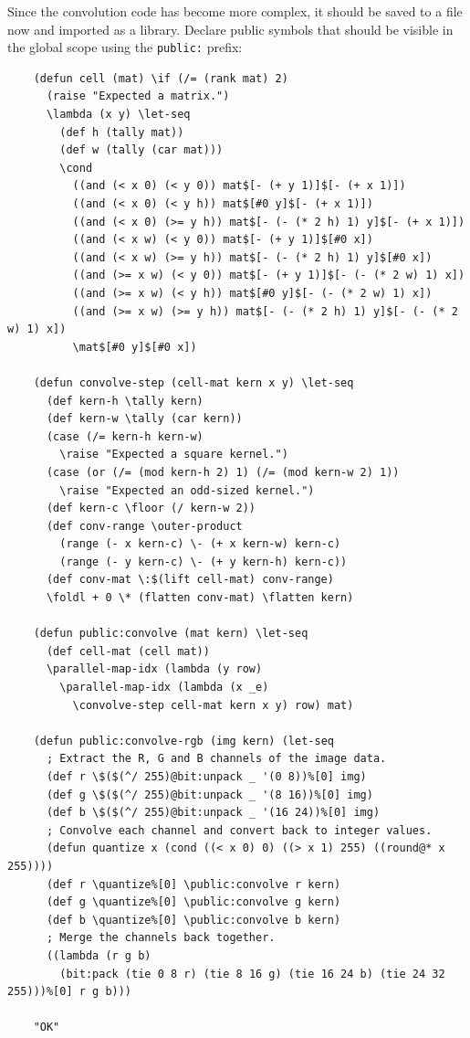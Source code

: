 Since the convolution code has become more complex, it should be saved to a file now and imported as a library. Declare public symbols that should be visible in the global scope using the \verb|public:| prefix:

\begin{Verbatim}
    (defun cell (mat) \if (/= (rank mat) 2)
      (raise "Expected a matrix.")
      \lambda (x y) \let-seq
        (def h (tally mat))
        (def w (tally (car mat)))
        \cond
          ((and (< x 0) (< y 0)) mat$[- (+ y 1)]$[- (+ x 1)])
          ((and (< x 0) (< y h)) mat$[#0 y]$[- (+ x 1)])
          ((and (< x 0) (>= y h)) mat$[- (- (* 2 h) 1) y]$[- (+ x 1)])
          ((and (< x w) (< y 0)) mat$[- (+ y 1)]$[#0 x])
          ((and (< x w) (>= y h)) mat$[- (- (* 2 h) 1) y]$[#0 x])
          ((and (>= x w) (< y 0)) mat$[- (+ y 1)]$[- (- (* 2 w) 1) x])
          ((and (>= x w) (< y h)) mat$[#0 y]$[- (- (* 2 w) 1) x])
          ((and (>= x w) (>= y h)) mat$[- (- (* 2 h) 1) y]$[- (- (* 2 w) 1) x])
          \mat$[#0 y]$[#0 x])
    
    (defun convolve-step (cell-mat kern x y) \let-seq
      (def kern-h \tally kern)
      (def kern-w \tally (car kern))
      (case (/= kern-h kern-w)
        \raise "Expected a square kernel.")
      (case (or (/= (mod kern-h 2) 1) (/= (mod kern-w 2) 1))
        \raise "Expected an odd-sized kernel.")
      (def kern-c \floor (/ kern-w 2))
      (def conv-range \outer-product
        (range (- x kern-c) \- (+ x kern-w) kern-c)
        (range (- y kern-c) \- (+ y kern-h) kern-c))
      (def conv-mat \:$(lift cell-mat) conv-range)
      \foldl + 0 \* (flatten conv-mat) \flatten kern)

    (defun public:convolve (mat kern) \let-seq
      (def cell-mat (cell mat))
      \parallel-map-idx (lambda (y row)
        \parallel-map-idx (lambda (x _e)
          \convolve-step cell-mat kern x y) row) mat)
    
    (defun public:convolve-rgb (img kern) (let-seq
      ; Extract the R, G and B channels of the image data.
      (def r \$($(^/ 255)@bit:unpack _ '(0 8))%[0] img)
      (def g \$($(^/ 255)@bit:unpack _ '(8 16))%[0] img)
      (def b \$($(^/ 255)@bit:unpack _ '(16 24))%[0] img)
      ; Convolve each channel and convert back to integer values.
      (defun quantize x (cond ((< x 0) 0) ((> x 1) 255) ((round@* x 255))))
      (def r \quantize%[0] \public:convolve r kern)
      (def g \quantize%[0] \public:convolve g kern)
      (def b \quantize%[0] \public:convolve b kern)
      ; Merge the channels back together.
      ((lambda (r g b)
        (bit:pack (tie 0 8 r) (tie 8 16 g) (tie 16 24 b) (tie 24 32 255)))%[0] r g b)))

    "OK"
\end{Verbatim}

